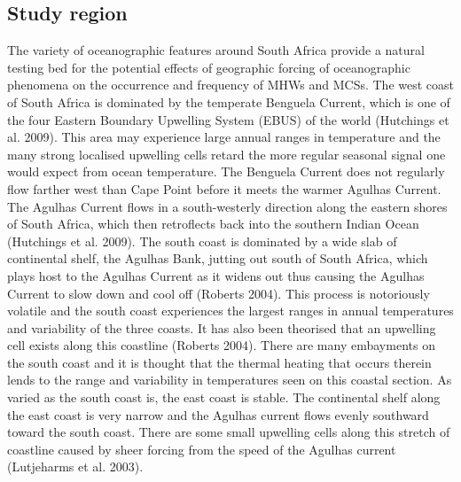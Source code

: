 \documentclass[a4paper,10pt,review]{elsarticle}
\begin{document}
\subsection{Study region}
The variety of oceanographic features around South Africa provide a natural testing bed for the potential effects of geographic forcing of oceanographic phenomena on the occurrence and frequency of MHWs and MCSs. The west coast of South Africa is dominated by the temperate Benguela Current, which is one of the four Eastern Boundary Upwelling System (EBUS) of the world (Hutchings et al. 2009). This area may experience large annual ranges in temperature and the many strong localised upwelling cells retard the more regular seasonal signal one would expect from ocean temperature. The Benguela Current does not regularly flow farther west than Cape Point before it meets the warmer Agulhas Current. The Agulhas Current flows in a south-westerly direction along the eastern shores of South Africa, which then retroflects back into the southern Indian Ocean (Hutchings et al. 2009). The south coast is dominated by a wide slab of continental shelf, the Agulhas Bank, jutting out south of South Africa, which plays host to the Agulhas Current as it widens out thus causing the Agulhas Current to slow down and cool off (Roberts 2004). This process is notoriously volatile and the south coast experiences the largest ranges in annual temperatures and variability of the three coasts. It has also been theorised that an upwelling cell exists along this coastline (Roberts 2004). There are many embayments on the south coast and it is thought that the thermal heating that occurs therein lends to the range and variability in temperatures seen on this coastal section. As varied as the south coast is, the east coast is stable. The continental shelf along the east coast is very narrow and the Agulhas current flows evenly southward toward the south coast. There are some small upwelling cells along this stretch of coastline caused by sheer forcing from the speed of the Agulhas current (Lutjeharms et al. 2003).
\end{document}
